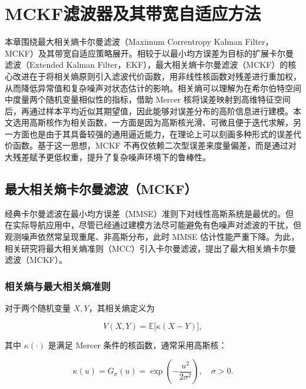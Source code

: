 \chapter{MCKF滤波器及其带宽自适应方法}


本章围绕最大相关熵卡尔曼滤波（Maximum Correntropy Kalman Filter，MCKF）及其带宽自适应策略展开。相较于以最小均方误差为目标的扩展卡尔曼滤波（Extended Kalman Filter，EKF），最大相关熵卡尔曼滤波（MCKF）的核心改进在于将相关熵原则引入滤波代价函数，用非线性核函数对残差进行重加权，从而降低异常值和复杂噪声对状态估计的影响\cite{izanloo2016kalman,CHEN201770}。相关熵可以理解为在希尔伯特空间中度量两个随机变量相似性的指标，借助 Mercer 核将误差映射到高维特征空间后，再通过样本平均近似其期望值，因此能够对误差分布的高阶信息进行建模。本文选用高斯核作为相关函数，一方面是因为高斯核光滑、可微且便于迭代求解，另一方面也是由于其具备较强的通用逼近能力，在理论上可以刻画多种形式的误差代价函数。基于这一思想，MCKF 不再仅依赖二次型误差来度量偏差，而是通过对大残差赋予更低权重，提升了复杂噪声环境下的鲁棒性\cite{xie2025adaptive}。


\section{最大相关熵卡尔曼滤波（MCKF）}

经典卡尔曼滤波在最小均方误差（MMSE）准则下对线性高斯系统是最优的。但在实际导航应用中，尽管已经通过建模方法尽可能避免有色噪声对滤波的干扰，但观测噪声依然常呈现重尾、非高斯分布，此时 MMSE 估计性能严重下降。为此，相关研究将最大相关熵准则（MCC）引入卡尔曼滤波，提出了最大相关熵卡尔曼滤波（MCKF）\cite{izanloo2016kalman}。

\subsection{相关熵与最大相关熵准则}

对于两个随机变量 \(X,Y\)，其相关熵定义为

\begin{equation}
    V(X,Y)=\mathbb{E}\bigl[\kappa(X-Y)\bigr],
\end{equation}

其中 \(\kappa(\cdot)\) 是满足 Mercer 条件的核函数，通常采用高斯核：

\begin{equation}
    \kappa(u)=G_{\sigma}(u)=\exp\left(-\frac{u^2}{2\sigma^2}\right),\quad \sigma>0.
\end{equation}


